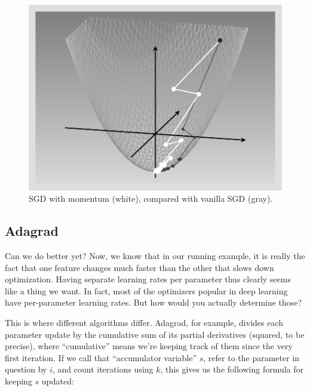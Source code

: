 \documentclass[
  letterpaper,
]{krantz}
\begin{document}
\begin{figure}[H]

{\centering \includegraphics{images/optimizers-momentum.png}

}

\caption{\label{fig-optimizers-momentum}SGD with momentum (white),
compared with vanilla SGD (gray).}

\end{figure}

\hypertarget{adagrad}{%
\subsection{\texorpdfstring{Adagrad}{Adagrad}}\label{adagrad}}

Can we do better yet? Now, we know that in our running example, it is
really the fact that one feature changes much faster than the other that
slows down optimization. Having separate learning rates per parameter
thus clearly seems like a thing we want. In fact, most of the optimizers
popular in deep learning have per-parameter learning rates. But how
would you actually determine those?

This is where different algorithms differ. Adagrad, for example, divides
each parameter update by the cumulative sum of its partial derivatives
(squared, to be precise), where ``cumulative'' means we're keeping track
of them since the very first iteration. If we call that ``accumulator
variable'' \(s\), refer to the parameter in question by \(i\), and count
iterations using \(k\), this gives us the following formula for keeping
\(s\) updated:
\end{document}
